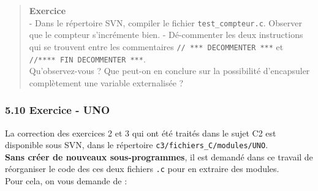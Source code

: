 \documentclass[11pt]{article}
\newenvironment{Shaded}{}{}
\newcommand{\KeywordTok}[1]{\textcolor[rgb]{0.00,0.44,0.13}{\textbf{{#1}}}}
\newcommand{\DataTypeTok}[1]{\textcolor[rgb]{0.56,0.13,0.00}{{#1}}}
\newcommand{\DecValTok}[1]{\textcolor[rgb]{0.25,0.63,0.44}{{#1}}}
\newcommand{\StringTok}[1]{\textcolor[rgb]{0.25,0.44,0.63}{{#1}}}
\newcommand{\CommentTok}[1]{\textcolor[rgb]{0.38,0.63,0.69}{\textit{{#1}}}}
\newcommand{\NormalTok}[1]{{#1}}
\newcommand{\SpecialCharTok}[1]{\textcolor[rgb]{0.25,0.44,0.63}{{#1}}}
\newcommand{\ImportTok}[1]{{#1}}
\newcommand{\ControlFlowTok}[1]{\textcolor[rgb]{0.00,0.44,0.13}{\textbf{{#1}}}}
\newcommand{\PreprocessorTok}[1]{\textcolor[rgb]{0.74,0.48,0.00}{{#1}}}
\begin{document}
\begin{Shaded}
\end{Shaded}

    \begin{quote}
\textbf{Exercice}\\
- Dans le répertoire SVN, compiler le fichier \texttt{test\_compteur.c}.
Observer que le compteur s'incrémente bien. - Dé-commenter les deux
instructions qui se trouvent entre les commentaires
\texttt{//\ ***\ DECOMMENTER\ ***} et
\texttt{//****\ FIN\ DECOMMENTER\ ***}.\\
Qu'observez-vous ? Que peut-on en conclure sur la possibilité
d'encapsuler complètement une variable externalisée ?
\end{quote}

    \subsubsection{5.10 Exercice - UNO}\label{exercice---uno}

La correction des exercices 2 et 3 qui ont été traités dans le sujet C2
est disponible sous SVN, dans le répertoire
\texttt{c3/fichiers\_C/modules/UNO}.\\
\textbf{Sans créer de nouveaux sous-programmes}, il est demandé dans ce
travail de réorganiser le code des ces deux fichiers \texttt{.c} pour en
extraire des modules.\\
Pour cela, on vous demande de :
\end{document}
